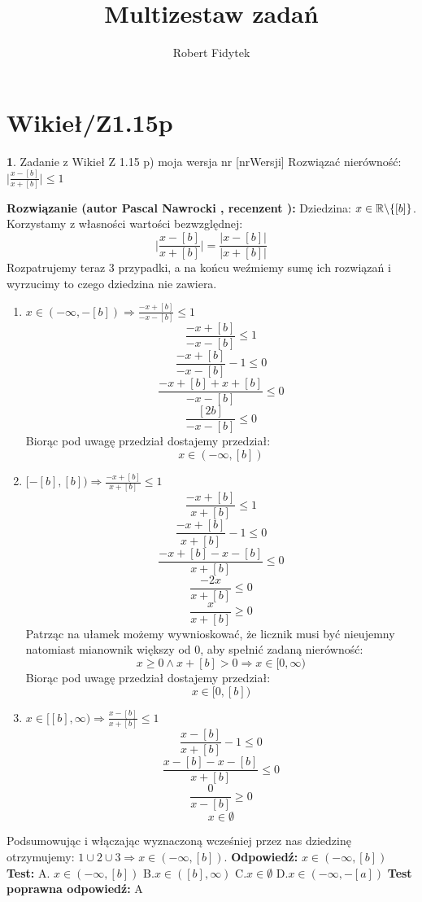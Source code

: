 \documentclass[12pt, a4paper]{article}
\title{Multizestaw zadań}
\author{Robert Fidytek}
\date{}
\theoremstyle{definition} %
\newtheorem{zad}{}
\newcommand{\kategoria}[1]{\section{#1}} %
\newcommand{\zadStart}[1]{\begin{zad}#1\newline} %
\newcommand{\zadStop}{\end{zad}}   %
\newcommand{\rozwStart}[2]{\noindent \textbf{Rozwiązanie (autor #1 , recenzent #2): }\newline} %
\newcommand{\rozwStop}{\newline}                                            %
\newcommand{\odpStart}{\noindent \textbf{Odpowiedź:}\newline}    %
\newcommand{\odpStop}{\newline}                                             %
\newcommand{\testStart}{\noindent \textbf{Test:}\newline} %
\newcommand{\testStop}{\newline} %
\newcommand{\kluczStart}{\noindent \textbf{Test poprawna odpowiedź:}\newline} %
\newcommand{\kluczStop}{\newline} %
\begin{document}
\maketitle


\kategoria{Wikieł/Z1.15p}
\zadStart{Zadanie z Wikieł Z 1.15 p) moja wersja nr [nrWersji]}
Rozwiązać nierówność: $\big|\frac{x-[b]}{x+[b]}\big|\leq1$
\zadStop
\rozwStart{Pascal Nawrocki}{}
Dziedzina: $x\in\mathbb{R}\symbol{92}\{[b]\}$.
Korzystamy z własności wartości bezwzględnej:
$$\bigg|\frac{x-[b]}{x+[b]}\bigg|=\frac{|x-[b]|}{|x+[b]|}$$
Rozpatrujemy teraz 3 przypadki, a na końcu weźmiemy sumę ich rozwiązań i wyrzucimy to czego dziedzina nie zawiera.
\begin{enumerate}
\item $x\in(-\infty,-[b])\Rightarrow\frac{-x+[b]}{-x-[b]}\leq1$
$$\frac{-x+[b]}{-x-[b]}\leq1$$
$$\frac{-x+[b]}{-x-[b]}-1\leq0$$
$$\frac{-x+[b]+x+[b]}{-x-[b]}\leq0$$
$$\frac{[2b]}{-x-[b]}\leq0$$
Biorąc pod uwagę przedział dostajemy przedział:
$$x\in(-\infty,[b])$$
\item $ [-[b],[b])\Rightarrow\frac{-x+[b]}{x+[b]}\leq1$
$$\frac{-x+[b]}{x+[b]}\leq1$$
$$\frac{-x+[b]}{x+[b]}-1\leq0$$
$$\frac{-x+[b]-x-[b]}{x+[b]}\leq0$$
$$\frac{-2x}{x+[b]}\leq0$$
$$\frac{x}{x+[b]}\geq0$$
Patrząc na ułamek możemy wywnioskować, że licznik musi być nieujemny natomiast mianownik większy od 0, aby spełnić zadaną nierówność: 
$$x\geq0 \wedge x+[b]>0\Rightarrow x\in[0,\infty)$$
Biorąc pod uwagę przedział dostajemy przedział:
$$x\in[0,[b])$$
\item $x\in[[b],\infty)\Rightarrow\frac{x-[b]}{x+[b]}\leq1$
$$\frac{x-[b]}{x+[b]}-1\leq0$$
$$\frac{x-[b]-x-[b]}{x+[b]}\leq0$$
$$\frac{0}{x-[b]}\geq0$$
$$x\in\emptyset$$
\end{enumerate}
Podsumowując i włączając wyznaczoną wcześniej przez nas dziedzinę otrzymujemy: $1\cup2\cup3\Rightarrow x\in(-\infty,[b])$.
\rozwStop
\odpStart
$x\in(-\infty,[b])$
\odpStop
\testStart
A. $x\in(-\infty,[b])$
B.$x\in([b],\infty)$
C.$x\in\emptyset$
D.$x\in(-\infty,-[a])$
\testStop
\kluczStart
A
\kluczStop
\end{document}
